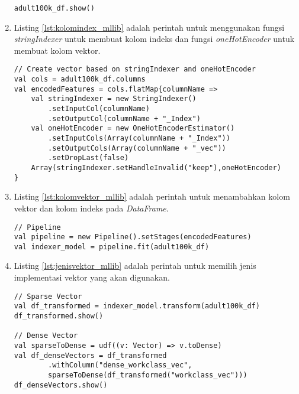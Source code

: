\begin{enumerate}
\begin{lstlisting}[basicstyle=\ttfamily, frame=single,
	columns=fullflexible, keepspaces=true, breaklines=true, label=lst:skemacsv_mllib, caption=Mengubah CSV Menjadi Dataframe]
adult100k_df.show()	
\end{lstlisting}

\item Listing \ref{lst:kolomindex_mllib} adalah perintah untuk menggunakan fungsi \textit{stringIndexer} untuk membuat kolom indeks dan fungsi \textit{oneHotEncoder} untuk membuat kolom vektor.
\begin{lstlisting}[basicstyle=\ttfamily, frame=single,
	columns=fullflexible, keepspaces=true, breaklines=true, label=lst:kolomindex_mllib, caption=Membuat Kolom Index]
// Create vector based on stringIndexer and oneHotEncoder
val cols = adult100k_df.columns
val encodedFeatures = cols.flatMap{columnName =>
	val stringIndexer = new StringIndexer()
		.setInputCol(columnName)
		.setOutputCol(columnName + "_Index")
	val oneHotEncoder = new OneHotEncoderEstimator()
		.setInputCols(Array(columnName + "_Index"))
		.setOutputCols(Array(columnName + "_vec"))
		.setDropLast(false)
	Array(stringIndexer.setHandleInvalid("keep"),oneHotEncoder)
}	
\end{lstlisting}

\item Listing \ref{lst:kolomvektor_mllib} adalah perintah untuk menambahkan kolom vektor dan kolom indeks pada \textit{DataFrame}.
\begin{lstlisting}[basicstyle=\ttfamily, frame=single,
	columns=fullflexible, keepspaces=true, breaklines=true, label=lst:kolomvektor_mllib, caption=Membuat Kolom Vektor]
// Pipeline
val pipeline = new Pipeline().setStages(encodedFeatures)
val indexer_model = pipeline.fit(adult100k_df)
\end{lstlisting}

\item Listing \ref{lst:jenisvektor_mllib} adalah perintah untuk memilih jenis implementasi vektor yang akan digunakan.
\begin{lstlisting}[basicstyle=\ttfamily, frame=single,
	columns=fullflexible, keepspaces=true, breaklines=true, label=lst:jenisvektor_mllib, caption=Memilih Jenis Vektor]
// Sparse Vector
val df_transformed = indexer_model.transform(adult100k_df)
df_transformed.show()

// Dense Vector
val sparseToDense = udf((v: Vector) => v.toDense)
val df_denseVectors = df_transformed
		.withColumn("dense_workclass_vec",
		sparseToDense(df_transformed("workclass_vec")))
df_denseVectors.show()	
\end{lstlisting}


\end{enumerate}
